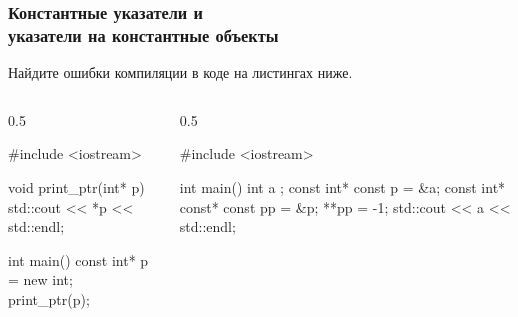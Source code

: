 \documentclass[compress, 8pt, aspectratio=169]{beamer}
\begin{document}
\begin{frame}[fragile]

    \frametitle{Константные указатели и \\ указатели на константные объекты}

    \begin{task}
        Найдите ошибки компиляции в коде на листингах ниже.
    \end{task}

    \begin{columns}[T]

        \begin{column}{0.5\textwidth}

            \begin{myinplacelisting}[minted language=cpp]
#include <iostream>

void print_ptr(int* p) {
    std::cout << *p
        << std::endl;
}

int main() {
    const int* p = new int{};
    print_ptr(p);
}
            \end{myinplacelisting}

        \end{column}

        \begin{column}{0.5\textwidth}

            \begin{myinplacelisting}[minted language=cpp]
#include <iostream>

int main() {
    int a {};
    const int* const p = &a;
    const int* const* const pp = &p;
    **pp = -1;
    std::cout << a
        << std::endl;
}
            \end{myinplacelisting}

        \end{column}

    \end{columns}

\end{frame}
\end{document}
